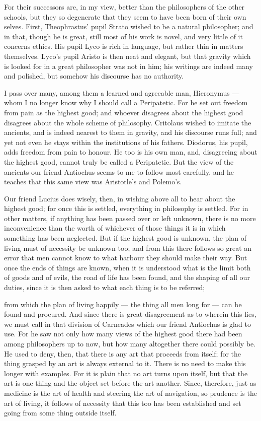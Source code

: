  For their successors are, in my view, better than the philosophers of the other schools, but they so degenerate that they seem to have been born of their own selves. First, Theophrastus' pupil Strato wished to be a natural philosopher; and in that, though he is great, still most of his work is novel, and very little of it concerns ethics. His pupil Lyco is rich in language, but rather thin in matters themselves. Lyco's pupil Aristo is then neat and elegant, but that gravity which is looked for in a great philosopher was not in him; his writings are indeed many and polished, but somehow his discourse has no authority.

 I pass over many, among them a learned and agreeable man, Hieronymus — whom I no longer know why I should call a Peripatetic. For he set out freedom from pain as the highest good; and whoever disagrees about the highest good disagrees about the whole scheme of philosophy. Critolaus wished to imitate the ancients, and is indeed nearest to them in gravity, and his discourse runs full; and yet not even he stays within the institutions of his fathers. Diodorus, his pupil, adds freedom from pain to honour. He too is his own man, and, disagreeing about the highest good, cannot truly be called a Peripatetic. But the view of the ancients our friend Antiochus seems to me to follow most carefully, and he teaches that this same view was Aristotle's and Polemo's.

 Our friend Lucius does wisely, then, in wishing above all to hear about the highest good; for once this is settled, everything in philosophy is settled. For in other matters, if anything has been passed over or left unknown, there is no more inconvenience than the worth of whichever of those things it is in which something has been neglected. But if the highest good is unknown, the plan of living must of necessity be unknown too; and from this there follows so great an error that men cannot know to what harbour they should make their way. But once the ends of things are known, when it is understood what is the limit both of goods and of evils, the road of life has been found, and the shaping of all our duties, since it is then asked to what each thing is to be referred;

 from which the plan of living happily — the thing all men long for — can be found and procured. And since there is great disagreement as to wherein this lies, we must call in that division of Carneades which our friend Antiochus is glad to use. For he saw not only how many views of the highest good there had been among philosophers up to now, but how many altogether there could possibly be. He used to deny, then, that there is any art that proceeds from itself; for the thing grasped by an art is always external to it. There is no need to make this longer with examples. For it is plain that no art turns upon itself, but that the art is one thing and the object set before the art another. Since, therefore, just as medicine is the art of health and steering the art of navigation, so prudence is the art of living, it follows of necessity that this too has been established and set going from some thing outside itself.


